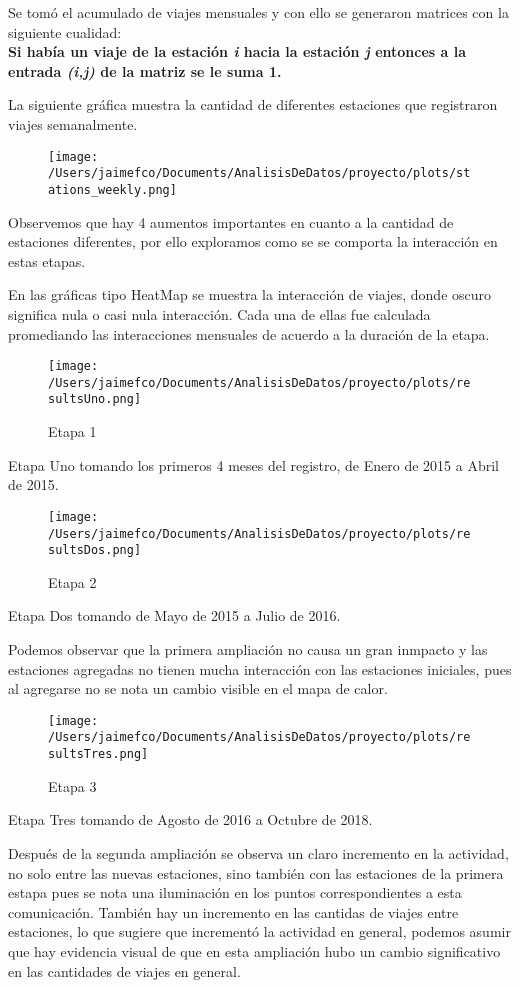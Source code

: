 \documentclass[
]{article}
\begin{document}
Se tomó el acumulado de viajes mensuales y con ello se generaron
matrices con la siguiente cualidad:\\
\textbf{Si había un viaje de la estación \emph{i} hacia la estación
\emph{j} entonces a la entrada \emph{(i,j)} de la matriz se le suma 1.}

La siguiente gráfica muestra la cantidad de diferentes estaciones que
registraron viajes semanalmente.

\begin{figure}
\centering
\texttt{[image: /Users/jaimefco/Documents/AnalisisDeDatos/proyecto/plots/stations\_weekly.png]}
\caption{}
\end{figure}

Observemos que hay 4 aumentos importantes en cuanto a la cantidad de
estaciones diferentes, por ello exploramos como se se comporta la
interacción en estas etapas.

En las gráficas tipo HeatMap se muestra la interacción de viajes, donde
oscuro significa nula o casi nula interacción. Cada una de ellas fue
calculada promediando las interacciones mensuales de acuerdo a la
duración de la etapa.

\begin{figure}
\centering
\texttt{[image: /Users/jaimefco/Documents/AnalisisDeDatos/proyecto/plots/resultsUno.png]}
\caption{Etapa 1}
\end{figure}

Etapa Uno tomando los primeros 4 meses del registro, de Enero de 2015 a
Abril de 2015.

\begin{figure}
\centering
\texttt{[image: /Users/jaimefco/Documents/AnalisisDeDatos/proyecto/plots/resultsDos.png]}
\caption{Etapa 2}
\end{figure}

Etapa Dos tomando de Mayo de 2015 a Julio de 2016.

Podemos observar que la primera ampliación no causa un gran inmpacto y
las estaciones agregadas no tienen mucha interacción con las estaciones
iniciales, pues al agregarse no se nota un cambio visible en el mapa de
calor.

\begin{figure}
\centering
\texttt{[image: /Users/jaimefco/Documents/AnalisisDeDatos/proyecto/plots/resultsTres.png]}
\caption{Etapa 3}
\end{figure}

Etapa Tres tomando de Agosto de 2016 a Octubre de 2018.

Después de la segunda ampliación se observa un claro incremento en la
actividad, no solo entre las nuevas estaciones, sino también con las
estaciones de la primera estapa pues se nota una iluminación en los
puntos correspondientes a esta comunicación. También hay un incremento
en las cantidas de viajes entre estaciones, lo que sugiere que
incrementó la actividad en general, podemos asumir que hay evidencia
visual de que en esta ampliación hubo un cambio significativo en las
cantidades de viajes en general.
\end{document}
